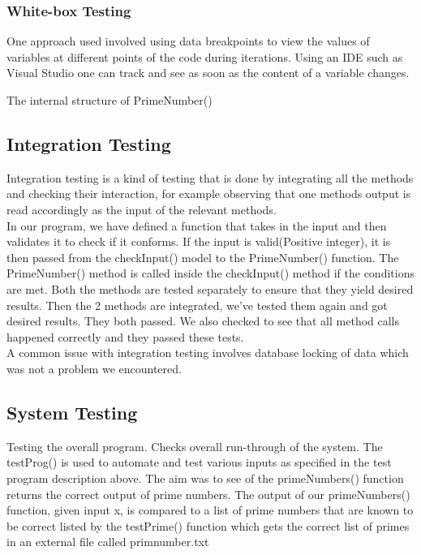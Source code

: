 \documentclass[11 pt]{article}
\begin{document}
\subsubsection{White-box Testing}
One approach used involved using data breakpoints to view the values of variables at different points of the code during iterations. Using an IDE such as Visual Studio one can track and see as soon as the content of a variable changes.

The internal structure of PrimeNumber()

\subsection{Integration Testing}
Integration testing is a kind of testing that is done by integrating all the methods and checking their interaction, for example observing that one methods output is read accordingly as the input of the relevant methods.\\
In our program, we have defined a function that takes in the input and then validates it to check if it conforms. If the input is valid(Positive integer), it is then passed from the checkInput() model to the PrimeNumber() function. The PrimeNumber() method is called inside the checkInput() method if the conditions are met. Both the methods are tested separately to ensure that they yield desired results. Then the 2 methods are integrated, we've tested them again and got desired results. They both passed.
We also checked to see that all method calls happened correctly and they passed these tests.\\
A common issue with integration testing involves database locking of data which was not a problem we encountered.

\subsection{System Testing}
Testing the overall program. Checks overall run-through of the system. The testProg() is used to automate and test various inputs as specified in the test program description above. The aim was to see of the primeNumbers() function returns the correct output of prime numbers. The output of our primeNumbers() function, given input x, is compared to a list of prime numbers that are known to be correct listed by the testPrime() function which gets the correct list of primes in an external file called prim\textunderscore number.txt\\
\end{document}
